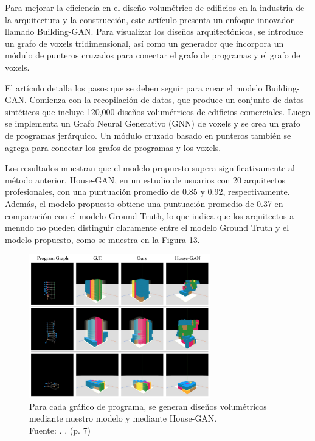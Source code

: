 Para mejorar la eficiencia en el diseño volumétrico de edificios en la industria de la arquitectura y la construcción, este artículo presenta un enfoque innovador llamado Building-GAN. Para visualizar los diseños arquitectónicos, se introduce un grafo de voxels tridimensional, así como un generador que incorpora un módulo de punteros cruzados para conectar el grafo de programas y el grafo de voxels.

El artículo detalla los pasos que se deben seguir para crear el modelo Building-GAN. Comienza con la recopilación de datos, que produce un conjunto de datos sintéticos que incluye 120,000 diseños volumétricos de edificios comerciales. Luego se implementa un Grafo Neural Generativo (GNN) de voxels y se crea un grafo de programas jerárquico. Un módulo cruzado basado en punteros también se agrega para conectar los grafos de programas y los voxels.

Los resultados muestran que el modelo propuesto supera significativamente al método anterior, House-GAN, en un estudio de usuarios con 20 arquitectos profesionales, con una puntuación promedio de 0.85 y 0.92, respectivamente. Además, el modelo propuesto obtiene una puntuación promedio de 0.37 en comparación con el modelo Ground Truth, lo que indica que los arquitectos a menudo no pueden distinguir claramente entre el modelo Ground Truth y el modelo propuesto, como se muestra en la Figura 13.

\begin{figure}[!ht]
	\begin{center}
		\includegraphics[width=0.7\textwidth]{2/figures/chang2021.png}
		\caption[Para cada gráfico de programa, se generan diseños volumétricos mediante nuestro modelo y mediante House-GAN]{Para cada gráfico de programa, se generan diseños volumétricos mediante nuestro modelo y mediante House-GAN.\\
		Fuente: \cite{pr_chang2021buildinggan}. . (p. 7)}
		\label{2:fig121}
	\end{center}
\end{figure}

